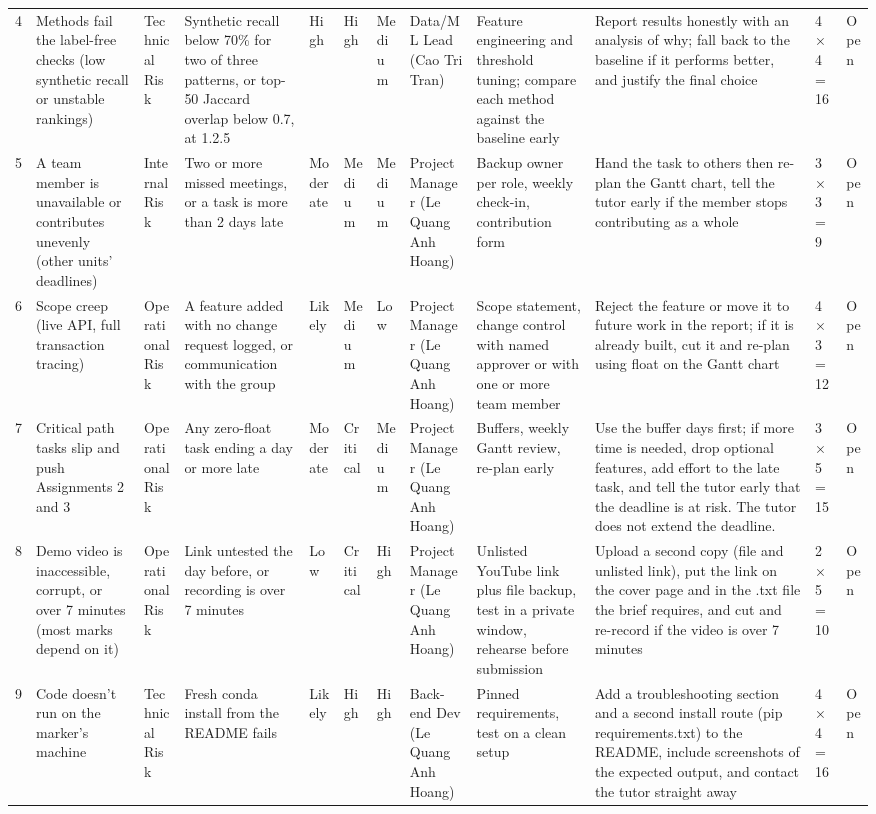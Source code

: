 \begin{landscape}
{\begin{xltabular}{\linewidth}{@{}L{0.65cm} Z L{1.85cm} Z L{1.45cm} L{1.3cm} L{1.6cm} L{2.0cm} Z Z L{1.25cm} L{1.4cm}@{}}
4 & Methods fail the label-free checks (low synthetic recall or unstable rankings) & Technical Risk & Synthetic recall below 70\% for two of three patterns, or top-50 Jaccard overlap below 0.7, at 1.2.5 & High & High & Medium & Data/\allowbreak{}ML Lead (Cao Tri Tran) & Feature engineering and threshold tuning; compare each method against the baseline early & Report results honestly with an analysis of why; fall back to the baseline if it performs better, and justify the final choice & 4×4=16 & Open \\
5 & A team member is unavailable or contributes unevenly (other units' deadlines) & Internal Risk & Two or more missed meetings, or a task is more than 2 days late & Moderate & Medium & Medium & Project Manager (Le Quang Anh Hoang) & Backup owner per role, weekly check-in, contribution form & Hand the task to others then re-plan the Gantt chart, tell the tutor early if the member stops contributing as a whole & 3×3=9 & Open \\
6 & Scope creep (live API, full transaction tracing) & Operational Risk & A feature added with no change request logged, or communication with the group & Likely & Medium & Low & Project Manager (Le Quang Anh Hoang) & Scope statement, change control with named approver or with one or more team member & Reject the feature or move it to future work in the report; if it is already built, cut it and re-plan using float on the Gantt chart & 4×3=12 & Open \\
7 & Critical path tasks slip and push Assignments 2 and 3 & Operational Risk & Any zero-float task ending a day or more late & Moderate & Critical & Medium & Project Manager (Le Quang Anh Hoang) & Buffers, weekly Gantt review, re-plan early & Use the buffer days first; if more time is needed, drop optional features, add effort to the late task, and tell the tutor early that the deadline is at risk. The tutor does not extend the deadline. & 3×5=15 & Open \\
8 & Demo video is inaccessible, corrupt, or over 7 minutes (most marks depend on it) & Operational Risk & Link untested the day before, or recording is over 7 minutes & Low & Critical & High & Project Manager (Le Quang Anh Hoang) & Unlisted YouTube link plus file backup, test in a private window, rehearse before submission & Upload a second copy (file and unlisted link), put the link on the cover page and in the .txt file the brief requires, and cut and re-record if the video is over 7 minutes & 2×5=10 & Open \\
9 & Code doesn't run on the marker's machine & Technical Risk & Fresh conda install from the README fails & Likely & High & High & Back-end Dev (Le Quang Anh Hoang) & Pinned requirements, test on a clean setup & Add a troubleshooting section and a second install route (pip requirements.txt) to the README, include screenshots of the expected output, and contact the tutor straight away & 4×4=16 & Open \\

\end{xltabular}}
\end{landscape}
